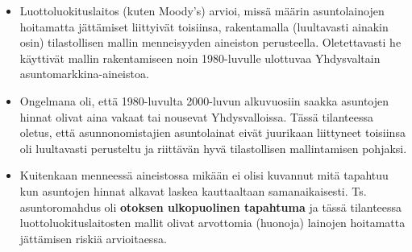 \documentclass[
]{book}
\providecommand{\tightlist}{%
  \setlength{\itemsep}{0pt}\setlength{\parskip}{0pt}}
\begin{document}
\begin{eblock}{}
\begin{itemize}
\tightlist
\item
  Luottoluokituslaitos (kuten Moody's) arvioi, missä määrin asuntolainojen hoitamatta jättämiset liittyivät toisiinsa, rakentamalla (luultavasti ainakin osin) tilastollisen mallin menneisyyden aineiston perusteella. Oletettavasti he käyttivät mallin rakentamiseen noin 1980-luvulle ulottuvaa Yhdysvaltain asuntomarkkina-aineistoa.
\item
  Ongelmana oli, että 1980-luvulta 2000-luvun alkuvuosiin saakka asuntojen hinnat olivat aina vakaat tai nousevat Yhdysvalloissa. Tässä tilanteessa oletus, että asunnonomistajien asuntolainat eivät juurikaan liittyneet toisiinsa oli luultavasti perusteltu ja riittävän hyvä tilastollisen mallintamisen pohjaksi.
\item
  Kuitenkaan menneessä aineistossa mikään ei olisi kuvannut mitä tapahtuu kun asuntojen hinnat alkavat laskea kauttaaltaan samanaikaisesti. Ts. asuntoromahdus oli \textbf{otoksen ulkopuolinen tapahtuma} ja tässä tilanteessa luottoluokituslaitosten mallit olivat arvottomia (huonoja) lainojen hoitamatta jättämisen riskiä arvioitaessa.
\end{itemize}

\end{eblock}

\hfill\break
\end{document}
